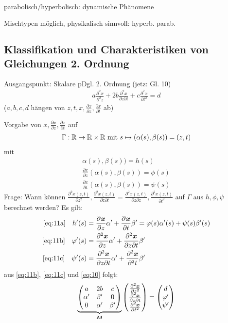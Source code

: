 parabolisch/hyperbolisch: dynamische Phänomene

Mischtypen möglich, physikalisch sinnvoll: hyperb.-parab.

\subsection{Klassifikation und Charakteristiken von Gleichungen 2. Ordnung}
Ausgangspunkt: Skalare pDgl. 2. Ordnung (jetz: Gl. 10)
\begin{align}
\label{eq:10}
a \frac{\partial^2 x}{\partial^2 z} + 2b \frac{\partial^2x}{\partial z\partial t} + c \frac{\partial^2 x}{\partial t^2} = d
\end{align}
($a,b,c,d$ hängen von $z,t,x,\frac{\partial x}{\partial z},\frac{\partial x}{\partial t}$ ab)

Vorgabe von $x,\frac{\partial x}{\partial z},\frac{\partial x}{\partial t}$ auf 
\begin{align*}
\Gamma:\R \rightarrow \R \times \R \textrm{ mit } s \mapsto (\alpha(s),\beta(s))=(z,t)
\end{align*}
mit 
\begin{subequations}
\begin{align}
\alpha(s),\beta(s)) = h(s) \label{eq:11a}\\
\frac{\partial x}{\partial z}(\alpha(s),\beta(s))=\phi(s) \label{eq:11b}\\
\frac{\partial x}{\partial t}(\alpha(s),\beta(s))=\psi(s) \label{eq:11c}
\end{align}
\end{subequations}
Frage: Wann können  $\frac{\partial^2 x(z,t)}{\partial z^2},\frac{\partial^2 x(z,t)}{\partial z \partial t}=\frac{\partial^2 x(z,t)}{\partial z \partial z},\frac{\partial^2 x(z,t)}{\partial t^2}$ auf $\Gamma$ aus $h,\phi, \psi$ berechnet werden?
Es gilt:
\begin{align*}
\eqref{eq:11a} \quad h'(s) &= \pd{\bm{x}}{z} \alpha' + \pd{\bm{x}}{t}\beta' = \varphi(s)\alpha'(s) + \psi(s)\beta'(s) \\
\eqref{eq:11b} \quad \varphi'(s) &= \pd[2]{\bm{x}}{z} \alpha' + \pd[2]{\bm{x}}{z\partial t}\beta' \\
\eqref{eq:11c} \quad \psi'(s) &= \pd[2]{\bm{x}}{z \partial t} \alpha' + \pd[2]{\bm{x}}{^2 t}\beta' \\
\end{align*}
aus \eqref{eq:11b}, \eqref{eq:11c} und \eqref{eq:10} folgt:
\begin{align}
\label{eq:12}
\underbrace{\begin{pmatrix}
a & 2b & c \\
\alpha' & \beta' & 0 \\
0 & \alpha'& \beta'
\end{pmatrix}}_{\bm{M}}\begin{pmatrix}
\pd[2]{\bm{x}}{z^2} \\ \pd[2]{\bm{x}}{z\partial t} \\ \pd[2]{\bm{x}}{t^2}
\end{pmatrix} =
\begin{pmatrix}
d \\ \varphi' \\ \psi'
\end{pmatrix}
\end{align}
